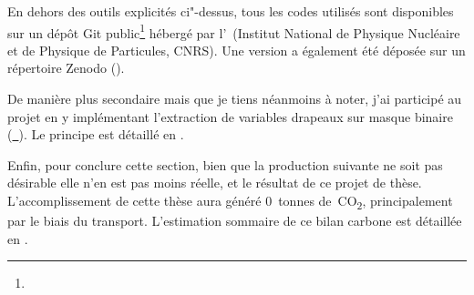 \bigskip

En dehors des outils explicités ci"-dessus, tous les codes utilisés  sont disponibles sur un dépôt Git public\footnote{} hébergé par l'~(Institut National de Physique Nucléaire et de Physique de Particules, CNRS).
Une version a également été déposée sur un répertoire Zenodo (\hbox{}).

\bigskip

De manière plus secondaire mais que je tiens néanmoins à noter, j'ai participé au projet   en y implémentant l'extraction de variables drapeaux sur masque binaire (\href{https://github.com/xarray-contrib/cf-xarray/pull/354}{~}).
Le principe est détaillé en .

\bigskip

Enfin, pour conclure cette section, bien que la production suivante ne soit pas désirable elle n'en est pas moins réelle, et le résultat de ce projet de thèse.
L'accomplissement de cette thèse aura généré 0~tonnes de~CO\textsubscript{2}, principalement par le biais du transport.
L'estimation sommaire de ce bilan carbone est détaillée en .
